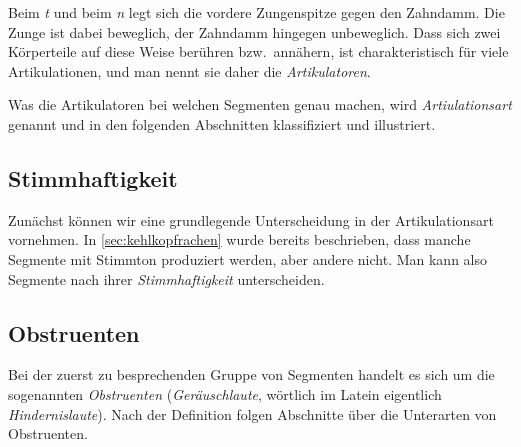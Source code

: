 Beim \textit{t} und beim \textit{n} legt sich die vordere Zungenspitze gegen den Zahndamm.
Die Zunge ist dabei beweglich, der Zahndamm hingegen unbeweglich.
Dass sich zwei Körperteile auf diese Weise berühren bzw.\ annähern, ist charakteristisch für viele Artikulationen, und man nennt sie daher die \textit{Artikulatoren}.


Was die Artikulatoren bei welchen Segmenten genau machen, wird \textit{Artiulationsart} genannt und in den folgenden Abschnitten klassifiziert und illustriert.


\subsection{Stimmhaftigkeit}

\label{sec:stimmhaftigkeit}

Zunächst können wir eine grundlegende Unterscheidung in der Artikulationsart vornehmen.
In \ref{sec:kehlkopfrachen} wurde bereits beschrieben, dass manche Segmente mit Stimmton produziert werden, aber andere nicht.
Man kann also Segmente nach ihrer \textit{Stimmhaftigkeit} unterscheiden.


\subsection{Obstruenten}

\label{sec:obstruenten}

Bei der zuerst zu besprechenden Gruppe von Segmenten handelt es sich um die sogenannten \textit{Obstruenten} (\textit{Geräuschlaute}, wörtlich im Latein eigentlich \textit{Hindernislaute}).
Nach der Definition folgen Abschnitte über die Unterarten von Obstruenten.


